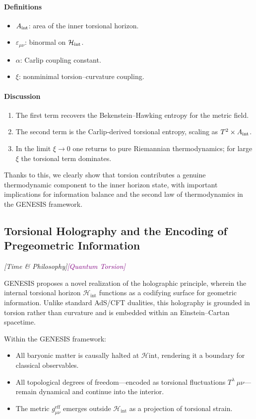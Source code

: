 \documentclass{article}
\newcommand{\quantumtag}{\textcolor{purple}{\textit{[Quantum Torsion]}}}
\newcommand{\timetag}{\textcolor{orange!80!black}{\textit{[Time \& Philosophy]}}}
\begin{document}
\paragraph{Definitions}
\begin{itemize}
  \item $A_{\rm int}$: area of the inner torsional horizon.
  \item $\varepsilon_{\mu\nu}$: binormal on $\mathcal H_{\rm int}$.
  \item $\alpha$: Carlip coupling constant.
  \item $\xi$: nonminimal torsion–curvature coupling.
\end{itemize}

\paragraph{Discussion}
\begin{enumerate}
  \item The first term recovers the Bekenstein–Hawking entropy for the metric field.  
  \item The second term is the Carlip‐derived torsional entropy, scaling as $T^2\times A_{\rm int}$.  
  \item In the limit $\xi\!\to\!0$ one returns to pure Riemannian thermodynamics; for large $\xi$ the torsional term dominates.  
\end{enumerate}
Thanks to this, we clearly show that torsion contributes a genuine thermodynamic component to the inner horizon state, with important implications for information balance and the second law of thermodynamics in the GENESIS framework.


\subsection{Torsional Holography and the Encoding of Pregeometric Information}
\timetag   \quantumtag


GENESIS proposes a novel realization of the holographic principle, wherein the internal torsional horizon $\mathcal{H}_{\text{int}}$ functions as a codifying surface for geometric information. Unlike standard AdS/CFT dualities, this holography is grounded in torsion rather than curvature and is embedded within an Einstein--Cartan spacetime.

Within the GENESIS framework: \begin{itemize} \item All baryonic matter is causally halted at $\mathcal{H}{\text{int}}$, rendering it a boundary for classical observables. \item All topological degrees of freedom---encoded as torsional fluctuations $T^{\lambda}{\ \mu\nu}$---remain dynamical and continue into the interior. \item The metric $g_{\mu\nu}^{\text{eff}}$ emerges outside $\mathcal{H}_{\text{int}}$ as a projection of torsional strain. \end{itemize}
\end{document}
